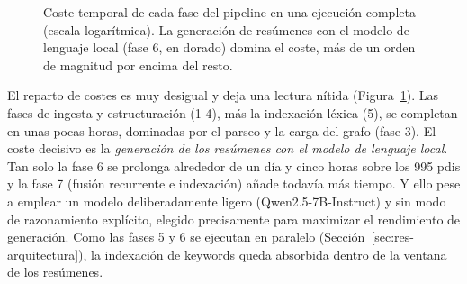 \begin{figure}[htbp]
  \centering


  \caption[Coste temporal de cada fase del pipeline]{Coste temporal de cada fase del pipeline en una ejecución completa (escala logarítmica). La generación de resúmenes con el modelo de lenguaje local (fase 6, en dorado) domina el coste, más de un orden de magnitud por encima del resto.}
  \label{fig:tiempos}

\end{figure}

El reparto de costes es muy desigual y deja una lectura nítida (Figura~\ref{fig:tiempos}).
Las fases de ingesta y estructuración (1-4), más la indexación léxica (5), se completan en unas pocas horas, dominadas por el parseo y la carga del grafo (fase 3).
El coste decisivo es la \emph{generación de los resúmenes con el modelo de lenguaje local}.
Tan solo la fase 6 se prolonga alrededor de un día y cinco horas sobre los 995 \glspl{pdi} y la fase 7 (fusión recurrente e indexación) añade todavía más tiempo.
Y ello pese a emplear un modelo deliberadamente ligero (Qwen2.5-7B-Instruct) y sin modo de razonamiento explícito, elegido precisamente para maximizar el rendimiento de generación.
Como las fases 5 y 6 se ejecutan en paralelo (Sección~\ref{sec:res-arquitectura}), la indexación de keywords queda absorbida dentro de la ventana de los resúmenes.


